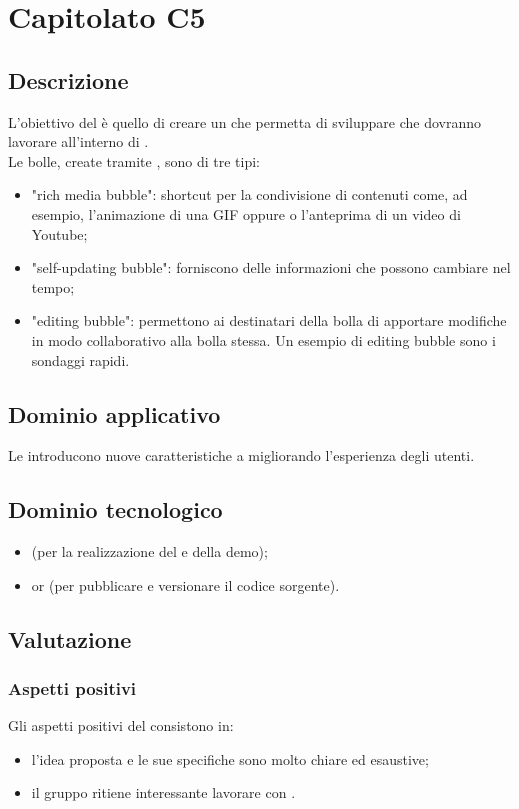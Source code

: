 \section {Capitolato C5}
	\subsection {Descrizione}
		L'obiettivo del  è quello di creare un  che permetta di sviluppare  che dovranno lavorare all'interno di . \\
		Le bolle, create tramite , sono di tre tipi:
		\begin{itemize}
			\item "rich media bubble": shortcut per la condivisione di contenuti come, ad esempio, l'animazione di una GIF oppure o l'anteprima di un video di Youtube;
			\item "self-updating bubble": forniscono delle informazioni che possono cambiare nel tempo;
			\item "editing bubble": permettono ai destinatari della bolla di apportare modifiche in modo collaborativo alla bolla stessa. Un esempio di editing bubble sono i sondaggi rapidi.
		\end{itemize}
	\subsection {Dominio applicativo}
		Le  introducono nuove caratteristiche a  migliorando l'esperienza degli utenti.
	\subsection {Dominio tecnologico}
		\begin{itemize}
		\item \textbf{} (per la realizzazione del  e della demo);
		\item \textbf{} or \textbf{} (per pubblicare e versionare il codice sorgente).
		\end{itemize}
	\subsection {Valutazione}
		\subsubsection {Aspetti positivi}
		Gli aspetti positivi del  consistono in:
			\begin{itemize}
				\item l’idea proposta e le sue specifiche sono molto chiare ed esaustive;
				\item il gruppo ritiene interessante lavorare con  .
			\end{itemize}

